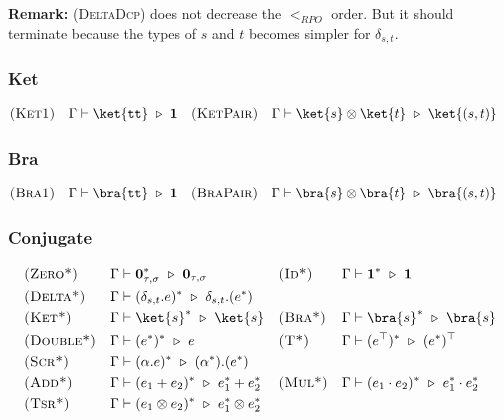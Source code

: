 
\textbf{Remark:} \textsc{(DeltaDcp)} does not decrease the $<_{RPO}$ order. But it should terminate because the types of $s$ and $t$ becomes simpler for $\delta_{s, t}$.

\subsubsection*{Ket}
\begin{align*}
  & \textsc{(Ket1)} && \Gamma \vdash \ket{\utt} \reduce \mathbf{1}
  && \textsc{(KetPair)} && \Gamma \vdash \ket{s} \otimes \ket{t}\reduce\ket{(s, t)} 
\end{align*}

\subsubsection*{Bra}
\begin{align*}
  & \textsc{(Bra1)} && \Gamma \vdash \bra{\utt} \reduce \mathbf{1}
  && \textsc{(BraPair)} && \Gamma \vdash \bra{s} \otimes \bra{t}\reduce\bra{(s, t)} 
\end{align*}


\subsubsection*{Conjugate}
\begin{align*}
  & \textsc{(Zero*)} && \Gamma \vdash \textbf{0}_{\tau, \sigma}^* \reduce \textbf{0}_{\tau, \sigma}
  && \textsc{(Id*)} && \Gamma \vdash \mathbf{1}^* \reduce \mathbf{1} \\
  & \textsc{(Delta*)} &&
  \Gamma \vdash (\delta_{s,t}.e)^* \reduce \delta_{s,t}.(e^*)\\
  & \textsc{(Ket*)} && \Gamma \vdash \ket{s}^* \reduce \ket{s}
  && \textsc{(Bra*)} && \Gamma \vdash \bra{s}^* \reduce \bra{s} \\
  & \textsc{(Double*)} && \Gamma \vdash (e^*)^*\reduce e
  && \textsc{(T*)} && \Gamma \vdash (e^\top)^* \reduce(e^*)^\top \\
  & \textsc{(Scr*)} && \Gamma \vdash (\alpha.e)^* \reduce (\alpha^*).(e^*) \\
  & \textsc{(Add*)} && \Gamma \vdash (e_1 + e_2)^* \reduce e_1^* + e_2^* 
  && \textsc{(Mul*)} && \Gamma \vdash (e_1 \cdot e_2)^* \reduce e_1^* \cdot e_2^* \\
  & \textsc{(Tsr*)} && \Gamma \vdash (e_1 \otimes e_2)^* \reduce e_1^* \otimes e_2^*
\end{align*}

